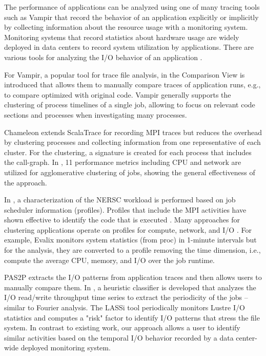 \documentclass{jhps}
\begin{document}

The performance of applications can be analyzed using one of many tracing tools such as Vampir \cite{weber2017visual} that record the behavior of an application explicitly or implicitly by collecting information about the resource usage with a monitoring system.
Monitoring systems that record statistics about hardware usage are widely deployed in data centers to record system utilization by applications.
There are various tools for analyzing the I/O behavior of an application \cite{TFAPIKBBCF19}.

For Vampir, a popular tool for trace file analysis, in \cite{weber2017visual} the Comparison View is introduced that allows them to manually compare traces of application runs, e.g., to compare optimized with original code.
Vampir generally supports the clustering of process timelines of a single job, allowing to focus on relevant code sections and processes when investigating many processes.

Chameleon \cite{bahmani2018chameleon} extends ScalaTrace for recording MPI traces but reduces the overhead by clustering processes and collecting information from one representative of each cluster.
For the clustering, a signature is created for each process that includes the call-graph.
In \cite{halawa2020unsupervised}, 11 performance metrics including CPU and network are utilized for agglomerative clustering of jobs, showing the general effectiveness of the approach.

In \cite{rodrigo2018towards}, a characterization of the NERSC workload is performed based on job scheduler information (profiles).
Profiles that include the MPI activities have shown effective to identify the code that is executed \cite{demasi2013identifying}.
Many approaches for clustering applications operate on profiles for compute, network, and I/O \cite{emeras2015evalix,liu2020characterization,bang2020hpc}.
For example, Evalix \cite{emeras2015evalix} monitors system statistics (from proc) in 1-minute intervals but for the analysis, they are converted to a profile removing the time dimension, i.e., compute the average CPU, memory, and I/O over the job runtime.

PAS2P \cite{mendez2012new} extracts the I/O patterns from application traces and then allows users to manually compare them.
In \cite{white2018automatic}, a heuristic classifier is developed that analyzes the I/O read/write throughput time series to extract the periodicity of the jobs -- similar to Fourier analysis.
The LASSi tool \cite{AOPIUOTUNS19} periodically monitors Lustre I/O statistics and computes a "risk" factor to identify I/O patterns that stress the file system.
In contrast to existing work, our approach allows a user to identify similar activities based on the temporal I/O behavior recorded by a data center-wide deployed monitoring system.
\end{document}
